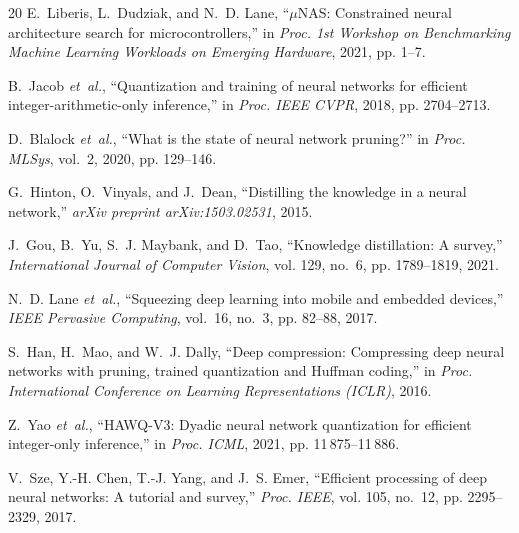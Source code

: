\documentclass[journal,10pt]{IEEEtran}
\begin{document}
\begin{thebibliography}{20}
E.~Liberis, L.~Dudziak, and N.~D. Lane, ``$\mu$NAS: Constrained neural architecture search for microcontrollers,'' in \emph{Proc. 1st Workshop on Benchmarking Machine Learning Workloads on Emerging Hardware}, 2021, pp. 1--7.

B.~Jacob \emph{et~al.}, ``Quantization and training of neural networks for efficient integer-arithmetic-only inference,'' in \emph{Proc. IEEE CVPR}, 2018, pp. 2704--2713.

D.~Blalock \emph{et~al.}, ``What is the state of neural network pruning?'' in \emph{Proc. MLSys}, vol.~2, 2020, pp. 129--146.

G.~Hinton, O.~Vinyals, and J.~Dean, ``Distilling the knowledge in a neural network,'' \emph{arXiv preprint arXiv:1503.02531}, 2015.

J.~Gou, B.~Yu, S.~J. Maybank, and D.~Tao, ``Knowledge distillation: A survey,'' \emph{International Journal of Computer Vision}, vol. 129, no.~6, pp. 1789--1819, 2021.

N.~D. Lane \emph{et~al.}, ``Squeezing deep learning into mobile and embedded devices,'' \emph{IEEE Pervasive Computing}, vol.~16, no.~3, pp. 82--88, 2017.

S.~Han, H.~Mao, and W.~J. Dally, ``Deep compression: Compressing deep neural networks with pruning, trained quantization and Huffman coding,'' in \emph{Proc. International Conference on Learning Representations (ICLR)}, 2016.

Z.~Yao \emph{et~al.}, ``HAWQ-V3: Dyadic neural network quantization for efficient integer-only inference,'' in \emph{Proc. ICML}, 2021, pp. 11\,875--11\,886.

V.~Sze, Y.-H. Chen, T.-J. Yang, and J.~S. Emer, ``Efficient processing of deep neural networks: A tutorial and survey,'' \emph{Proc. IEEE}, vol. 105, no.~12, pp. 2295--2329, 2017.

\end{thebibliography}
\end{document}
